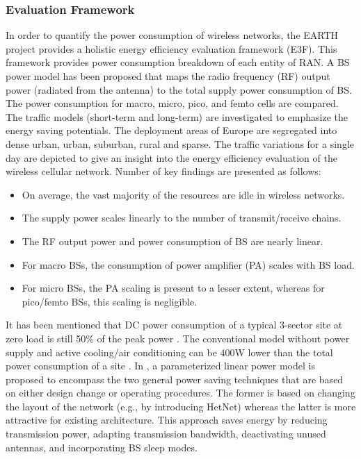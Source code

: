 \documentclass[article,10pt,twocolumn]{IEEEtran}
\begin{document}
\subsubsection{Evaluation Framework}\label{sec:efw}
In order to quantify the power consumption of wireless networks, the EARTH project provides a holistic energy efficiency evaluation framework (E3F). This framework provides power consumption breakdown of each entity of RAN. A BS power model has been proposed that maps the radio frequency (RF) output power (radiated from the antenna) to the total supply power consumption of BS. The power consumption for macro, micro, pico, and femto cells are compared. The traffic models (short-term and long-term) are investigated to emphasize the energy saving potentials. The deployment areas of Europe are segregated into dense urban, urban, suburban, rural and sparse. The traffic variations for a single day are depicted to give an insight into the energy efficiency evaluation of the wireless cellular network. Number of key findings are presented as follows:
\begin{itemize}
  \item On average, the vast majority of the resources are idle in wireless networks.
  \item The supply power scales linearly to the number of transmit/receive chains.
  \item The RF output power and power consumption of BS are nearly linear.
  \item For macro BSs, the consumption of power amplifier (PA) scales with BS load.
  \item For micro BSs, the PA scaling is present to a lesser extent, whereas for pico/femto BSs, this scaling is negligible.
\end{itemize}

It has been mentioned that DC power consumption of a typical 3-sector site at zero load is still 50\% of the peak power \citep{5722322}. The conventional model without power supply and active cooling/air conditioning can be 400W lower than the total power consumption of a site \citep{5621969}. In \citep{6600717}, a parameterized linear power model is proposed to encompass the two general power saving techniques that are based on either design change or operating procedures. The former is based on changing the layout of the network (e.g., by introducing HetNet) whereas the latter is more attractive for existing architecture. This approach saves energy by reducing transmission power, adapting transmission bandwidth, deactivating unused antennas, and incorporating BS sleep modes.
\end{document}

